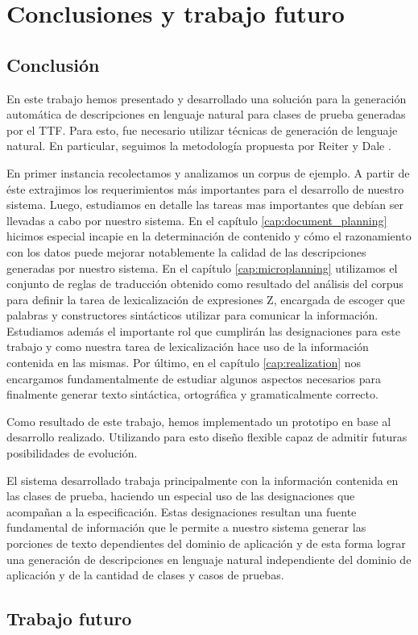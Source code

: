 \chapter{Conclusiones y trabajo futuro}
\label{cap:conclusion}

\section*{Conclusión}
En este trabajo hemos presentado y desarrollado una solución para la generación automática de descripciones en lenguaje natural para clases de prueba generadas por el TTF. Para esto, fue necesario utilizar técnicas de generación de lenguaje natural. En particular, seguimos la metodología propuesta por Reiter y Dale \cite{reiter_dale}.

En primer instancia recolectamos y analizamos un corpus de ejemplo. A partir de éste extrajimos los requerimientos más importantes para el desarrollo de nuestro sistema. Luego, estudiamos en detalle las tareas mas importantes que debían ser llevadas a cabo por nuestro sistema. En el capítulo \ref{cap:document_planning} hicimos especial incapie en la determinación de contenido y cómo el razonamiento con los datos puede mejorar notablemente la calidad de las descripciones generadas por nuestro sistema. En el capítulo \ref{cap:microplanning} utilizamos el conjunto de reglas de traducción obtenido como resultado del análisis del corpus para definir la tarea de lexicalización de expresiones Z, encargada de escoger que palabras y constructores sintácticos utilizar para comunicar la información. Estudiamos además el importante rol que cumplirán las designaciones para este trabajo y como nuestra tarea de lexicalización hace uso de la información contenida en las mismas. Por último, en el capítulo \ref{cap:realization} nos encargamos fundamentalmente de estudiar algunos aspectos necesarios para finalmente generar texto sintáctica, ortográfica y gramaticalmente correcto.

Como resultado de este trabajo, hemos implementado un prototipo en base al desarrollo realizado. Utilizando para esto diseño flexible capaz de admitir futuras posibilidades de evolución. 

El sistema desarrollado trabaja principalmente con la información contenida en las clases de prueba, haciendo un especial uso de las designaciones que acompañan a la especificación. Estas designaciones resultan una fuente fundamental de información que le permite a nuestro sistema generar las porciones de texto dependientes del dominio de aplicación y de esta forma lograr una generación de descripciones en lenguaje natural independiente del dominio de aplicación y de la cantidad de clases y casos de pruebas.

\section*{Trabajo futuro}

